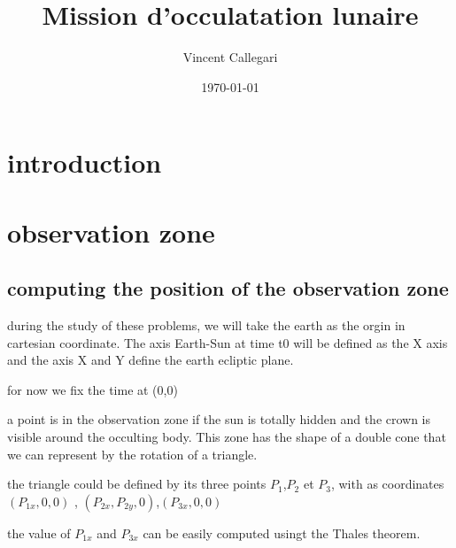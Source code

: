 \documentclass{article} %
\title{Mission d'occulatation lunaire} %
\author{Vincent Callegari} %
\date{\today} %
\begin{document}
		\maketitle
		\section{introduction}%
		\section{observation zone}
		\subsection{computing the position of the observation zone}
		
		during the study of these problems, we will take the earth as the orgin in cartesian coordinate. The axis Earth-Sun at time t0 will be defined as the X axis and the axis X and Y define the earth ecliptic plane. 
		
		for now we fix the time at (0,0)
		
		
		a point is in the observation zone if the sun is totally hidden and the crown is visible around the occulting body. This zone has the shape of a double cone that we can represent by the rotation of a triangle.
		
		
		the triangle could be defined by its three points
		$P_1$,$P_2$ et $P_3$, with as coordinates $(P_{1x},0,0)$ , $(P_{2x},P_{2y},0)$,$(P_{3x},0,0)$ 
		
		
		the value of $P_{1x}$ and $P_{3x}$ can be easily computed usingt the Thales theorem.
		
		
\end{document}

